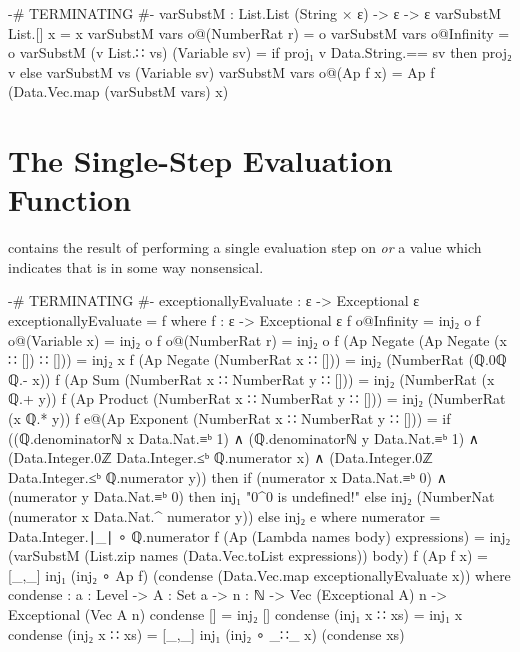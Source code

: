 \documentclass{report}
\begin{document}
\begin{code}
{-# TERMINATING #-}
varSubstM : List.List (String × ε) -> ε -> ε
varSubstM List.[] x = x
varSubstM vars o@(NumberRat r) = o
varSubstM vars o@Infinity = o
varSubstM (v List.∷ vs) (Variable sv) =
  if proj₁ v Data.String.== sv
     then proj₂ v
     else varSubstM vs (Variable sv)
varSubstM vars o@(Ap f x) = Ap f (Data.Vec.map (varSubstM vars) x)
\end{code}

\section{The Single-Step Evaluation Function}
  contains the result of performing a single evaluation step on  \emph{or} a value which indicates that  is in some way nonsensical.

\begin{code}
{-# TERMINATING #-}
exceptionallyEvaluate : ε -> Exceptional ε
exceptionallyEvaluate = f
  where
  f : ε -> Exceptional ε
  f o@Infinity = inj₂ o
  f o@(Variable x) = inj₂ o
  f o@(NumberRat r) = inj₂ o
  f (Ap Negate (Ap Negate (x ∷ []) ∷ [])) = inj₂ x
  f (Ap Negate (NumberRat x ∷ [])) = inj₂ (NumberRat (ℚ.0ℚ ℚ.- x))
  f (Ap Sum (NumberRat x ∷ NumberRat y ∷ [])) =
    inj₂ (NumberRat (x ℚ.+ y))
  f (Ap Product (NumberRat x ∷ NumberRat y ∷ [])) =
    inj₂ (NumberRat (x ℚ.* y))
  f e@(Ap Exponent (NumberRat x ∷ NumberRat y ∷ [])) =
    if ((ℚ.denominatorℕ x Data.Nat.≡ᵇ 1) ∧
        (ℚ.denominatorℕ y Data.Nat.≡ᵇ 1) ∧
        (Data.Integer.0ℤ Data.Integer.≤ᵇ ℚ.numerator x) ∧
        (Data.Integer.0ℤ Data.Integer.≤ᵇ ℚ.numerator y))
       then if (numerator x Data.Nat.≡ᵇ 0) ∧
               (numerator y Data.Nat.≡ᵇ 0)
             then inj₁ "0^0 is undefined!"
             else inj₂ (NumberNat (numerator x Data.Nat.^ numerator y))
       else inj₂ e
       where numerator = Data.Integer.∣_∣ ∘ ℚ.numerator
  f (Ap (Lambda names body) expressions) =
    inj₂ (varSubstM (List.zip names (Data.Vec.toList expressions)) body)
  f (Ap f x) = [_,_] inj₁ (inj₂ ∘ Ap f) (condense (Data.Vec.map exceptionallyEvaluate x))
    where
    condense : {a : Level} ->
               {A : Set a} ->
               {n : ℕ} ->
               Vec (Exceptional A) n ->
               Exceptional (Vec A n)
    condense [] = inj₂ []
    condense (inj₁ x ∷ xs) = inj₁ x
    condense (inj₂ x ∷ xs) = [_,_] inj₁ (inj₂ ∘ _∷_ x) (condense xs)
\end{code}
\end{document}
